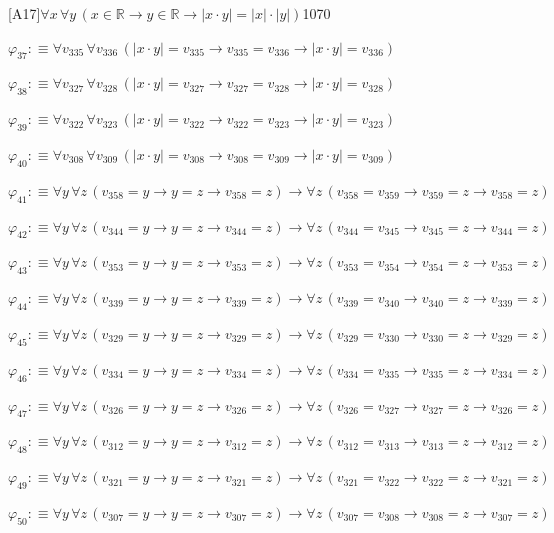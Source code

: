 \begin{fullproof}{[A17]}{$\forall x\,\forall y\,(x \in \mathbb{R} \to y \in \mathbb{R} \to \lvert x \cdot y \rvert = \lvert x \rvert \cdot \lvert y \rvert)$}{1070}
\begin{abbrevlist}
\item $\varphi_{37} :\equiv \forall v_{335}\,\forall v_{336}\,(\lvert x \cdot y \rvert = v_{335} \to v_{335} = v_{336} \to \lvert x \cdot y \rvert = v_{336})$
\item $\varphi_{38} :\equiv \forall v_{327}\,\forall v_{328}\,(\lvert x \cdot y \rvert = v_{327} \to v_{327} = v_{328} \to \lvert x \cdot y \rvert = v_{328})$
\item $\varphi_{39} :\equiv \forall v_{322}\,\forall v_{323}\,(\lvert x \cdot y \rvert = v_{322} \to v_{322} = v_{323} \to \lvert x \cdot y \rvert = v_{323})$
\item $\varphi_{40} :\equiv \forall v_{308}\,\forall v_{309}\,(\lvert x \cdot y \rvert = v_{308} \to v_{308} = v_{309} \to \lvert x \cdot y \rvert = v_{309})$
\item $\varphi_{41} :\equiv \forall y\,\forall z\,(v_{358} = y \to y = z \to v_{358} = z) \to \forall z\,(v_{358} = v_{359} \to v_{359} = z \to v_{358} = z)$
\item $\varphi_{42} :\equiv \forall y\,\forall z\,(v_{344} = y \to y = z \to v_{344} = z) \to \forall z\,(v_{344} = v_{345} \to v_{345} = z \to v_{344} = z)$
\item $\varphi_{43} :\equiv \forall y\,\forall z\,(v_{353} = y \to y = z \to v_{353} = z) \to \forall z\,(v_{353} = v_{354} \to v_{354} = z \to v_{353} = z)$
\item $\varphi_{44} :\equiv \forall y\,\forall z\,(v_{339} = y \to y = z \to v_{339} = z) \to \forall z\,(v_{339} = v_{340} \to v_{340} = z \to v_{339} = z)$
\item $\varphi_{45} :\equiv \forall y\,\forall z\,(v_{329} = y \to y = z \to v_{329} = z) \to \forall z\,(v_{329} = v_{330} \to v_{330} = z \to v_{329} = z)$
\item $\varphi_{46} :\equiv \forall y\,\forall z\,(v_{334} = y \to y = z \to v_{334} = z) \to \forall z\,(v_{334} = v_{335} \to v_{335} = z \to v_{334} = z)$
\item $\varphi_{47} :\equiv \forall y\,\forall z\,(v_{326} = y \to y = z \to v_{326} = z) \to \forall z\,(v_{326} = v_{327} \to v_{327} = z \to v_{326} = z)$
\item $\varphi_{48} :\equiv \forall y\,\forall z\,(v_{312} = y \to y = z \to v_{312} = z) \to \forall z\,(v_{312} = v_{313} \to v_{313} = z \to v_{312} = z)$
\item $\varphi_{49} :\equiv \forall y\,\forall z\,(v_{321} = y \to y = z \to v_{321} = z) \to \forall z\,(v_{321} = v_{322} \to v_{322} = z \to v_{321} = z)$
\item $\varphi_{50} :\equiv \forall y\,\forall z\,(v_{307} = y \to y = z \to v_{307} = z) \to \forall z\,(v_{307} = v_{308} \to v_{308} = z \to v_{307} = z)$

\end{abbrevlist}
\end{fullproof}
